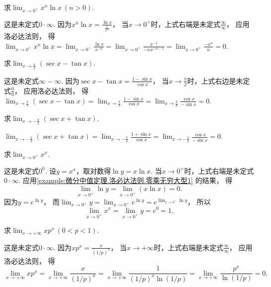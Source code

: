 \begin{example}\label{example:微分中值定理.洛必达法则.零乘无穷大型1}
求\(\lim_{x\to0^+} x^n \ln x\ (n > 0)\).
\begin{solution}
这是未定式\(0\cdot\infty\).
因为\(x^n \ln x = \frac{\ln x}{\frac{1}{x^n}}\)，
当\(x\to0^+\)时，上式右端是未定式\(\frac{\infty}{\infty}\)，
应用洛必达法则，
得\(\lim_{x\to0^+} x^n \ln x
= \lim_{x\to0^+} \frac{\ln x}{x^{-n}}
= \lim_{x\to0^+} \frac{x^{-1}}{-nx^{-n-1}}
= \lim_{x\to0^+} \frac{-x^n}{n}
= 0\).
\end{solution}
\end{example}

\begin{example}
求\(\lim_{x\to\frac\pi2} (\sec x-\tan x)\).
\begin{solution}
这是未定式\(\infty-\infty\).
因为\(\sec x-\tan x = \frac{1-\sin x}{\cos x}\)，
当\(x\to\frac\pi2\)时，上式右边是未定式\(\frac00\)，
应用洛必达法则，
得\(\lim_{x\to\frac\pi2} (\sec x-\tan x)
= \lim_{x\to\frac\pi2} \frac{1-\sin x}{\cos x}
= \lim_{x\to\frac\pi2} \frac{\cos x}{-\sin x}
= 0\).
\end{solution}
\end{example}

\begin{example}
求\(\lim_{x\to-\frac\pi2} (\sec x+\tan x)\).
\begin{solution}
\(\lim_{x\to-\frac\pi2} (\sec x+\tan x)
= \lim_{x\to-\frac\pi2} \frac{1+\sin x}{\cos x}
= \lim_{x\to-\frac\pi2} \frac{\cos x}{-\sin x}
= 0\).
\end{solution}
\end{example}

\begin{example}\label{example:微分中值定理.洛必达法则.零次方零型1}
求\(\lim_{x\to0^+} x^x\).
\begin{solution}
这是未定式\(0^0\).
设\(y = x^x\)，取对数得\(\ln y = x \ln x\).
当\(x\to0^+\)时，上式右端是未定式\(0\cdot\infty\).
应用\cref{example:微分中值定理.洛必达法则.零乘无穷大型1} 的结果，
得\[
	\lim_{x\to0^+} \ln y
	= \lim_{x\to0^+} (x \ln x) = 0.
\]
因为\(y = e^{\ln y}\)，
而\(\lim_{x\to0^+} y
= \lim_{x\to0^+} e^{\ln y}
= e^{\lim_{x\to0^+} \ln y}\)，
所以\[
	\lim_{x\to0^+} x^x
	= \lim_{x\to0^+} y
	= e^0
	= 1.
\]
\end{solution}
\end{example}

\begin{example}\label{example:微分中值定理.洛必达法则.零乘无穷大型2}
求\(\lim_{x\to+\infty} x p^x\ (0<p<1)\).
\begin{solution}
这是未定式\(0\cdot\infty\).
因为\(x p^x =  \frac{x}{(1/p)^x}\)，
当\(x\to+\infty\)时，上式右端是未定式\(\frac{\infty}{\infty}\)，
应用洛必达法则，
得\[
	\lim_{x\to+\infty} x p^x
	= \lim_{x\to+\infty} \frac{x}{(1/p)^x}
	= \lim_{x\to+\infty} \frac{1}{(1/p)^x \ln(1/p)}
	= \lim_{x\to+\infty} \frac{p^x}{\ln(1/p)}
	= 0.
\]
\end{solution}
\end{example}

